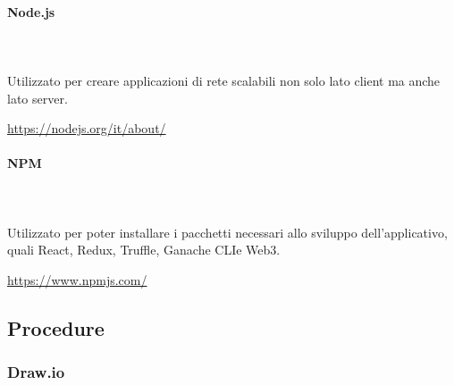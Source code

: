 \paragraph{Node.js} \mbox{}\\ \mbox{}\\
Utilizzato per creare applicazioni di rete scalabili non solo lato client ma anche lato server.\\
\centerline{\url{https://nodejs.org/it/about/}}

\paragraph{NPM} \mbox{}\\ \mbox{}\\
Utilizzato per poter installare i pacchetti necessari allo sviluppo dell'applicativo, quali React\glo, Redux\glo, Truffle\glo, Ganache CLI\glosp e Web3\glo. \\
\centerline{\url{https://www.npmjs.com/}}

\subsection{Procedure}
\subsubsection{Draw.io} 
